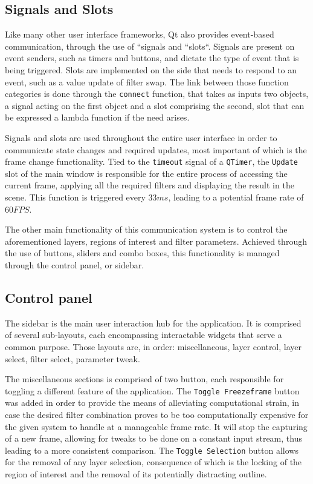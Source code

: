 \subsection{Signals and Slots}

Like many other user interface frameworks, Qt also provides event-based communication, through the use of
``signals and ``slots``. Signals are present on event senders, such as timers and buttons, and dictate the
type of event that is being triggered. Slots are implemented on the side that needs to respond to an event,
such as a value update of filter swap. The link between those function categories is done through the
\verb|connect| function, that takes as inputs two objects, a signal acting on the first object and a slot
comprising the second, slot that can be expressed a lambda function if the need arises. \cite{qtDoc}

Signals and slots are used throughout the entire user interface in order to communicate state changes and
required updates, most important of which is the frame change functionality. Tied to the \verb|timeout|
signal of a \verb|QTimer|, the \verb|Update| slot of the main window is responsible for the entire process
of accessing the current frame, applying all the required filters and displaying the result in the scene.
This function is triggered every \(33 ms\), leading to a potential frame rate of \(60 FPS\).

The other main functionality of this communication system is to control the aforementioned layers, regions
of interest and filter parameters. Achieved through the use of buttons, sliders and combo boxes, this
functionality is managed through the control panel, or sidebar.

\subsection{Control panel}

The sidebar is the main user interaction hub for the application. It is comprised of several sub-layouts,
each encompassing interactable widgets that serve a common purpose. Those layouts are, in order:
miscellaneous, layer control, layer select, filter select, parameter tweak.

The miscellaneous sections is comprised of two button, each responsible for toggling a different feature of
the application. The \verb|Toggle Freezeframe| button was added in order to provide the means of alleviating
computational strain, in case the desired filter combination proves to be too computationally expensive for
the given system to handle at a manageable frame rate. It will stop the capturing of a new frame, allowing for
tweaks to be done on a constant input stream, thus leading to a more consistent comparison. The
\verb|Toggle Selection| button allows for the removal of any layer selection, consequence of which is the
locking of the region of interest and the removal of its potentially distracting outline.

